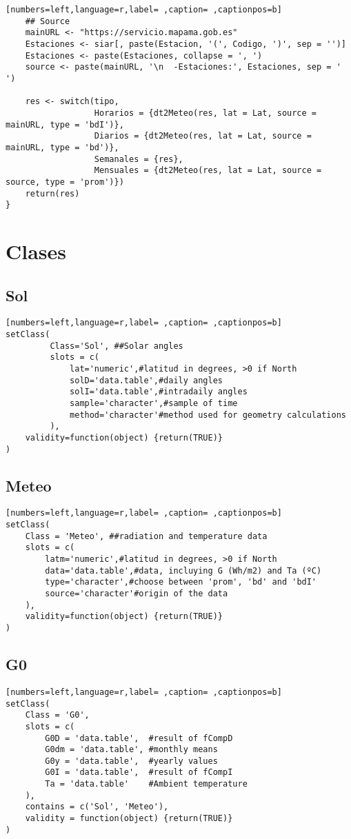 \begin{lstlisting}[numbers=left,language=r,label= ,caption= ,captionpos=b]
    ## Source
    mainURL <- "https://servicio.mapama.gob.es"
    Estaciones <- siar[, paste(Estacion, '(', Codigo, ')', sep = '')]
    Estaciones <- paste(Estaciones, collapse = ', ')
    source <- paste(mainURL, '\n  -Estaciones:', Estaciones, sep = ' ')

    res <- switch(tipo,
                  Horarios = {dt2Meteo(res, lat = Lat, source = mainURL, type = 'bdI')},
                  Diarios = {dt2Meteo(res, lat = Lat, source = mainURL, type = 'bd')},
                  Semanales = {res},
                  Mensuales = {dt2Meteo(res, lat = Lat, source = source, type = 'prom')})
    return(res)
}
\end{lstlisting}

\section{Clases}
\label{sec:orgbdd5d8b}
\subsection{Sol}
\label{sec:org8042f62}
\begin{lstlisting}[numbers=left,language=r,label= ,caption= ,captionpos=b]
setClass(
         Class='Sol', ##Solar angles
         slots = c(
             lat='numeric',#latitud in degrees, >0 if North
             solD='data.table',#daily angles
             solI='data.table',#intradaily angles
             sample='character',#sample of time
             method='character'#method used for geometry calculations
         ),
    validity=function(object) {return(TRUE)}
)
\end{lstlisting}
\subsection{Meteo}
\label{sec:orge31062d}
\begin{lstlisting}[numbers=left,language=r,label= ,caption= ,captionpos=b]
setClass(
    Class = 'Meteo', ##radiation and temperature data
    slots = c(
        latm='numeric',#latitud in degrees, >0 if North
        data='data.table',#data, incluying G (Wh/m2) and Ta (ºC)
        type='character',#choose between 'prom', 'bd' and 'bdI'
        source='character'#origin of the data
    ),
    validity=function(object) {return(TRUE)}
)
\end{lstlisting}
\subsection{G0}
\label{sec:orgfc89e75}
\begin{lstlisting}[numbers=left,language=r,label= ,caption= ,captionpos=b]
setClass(
    Class = 'G0',
    slots = c(
        G0D = 'data.table',  #result of fCompD
        G0dm = 'data.table', #monthly means
        G0y = 'data.table',  #yearly values
        G0I = 'data.table',  #result of fCompI
        Ta = 'data.table'    #Ambient temperature
    ),
    contains = c('Sol', 'Meteo'),
    validity = function(object) {return(TRUE)}
)

\end{lstlisting}
